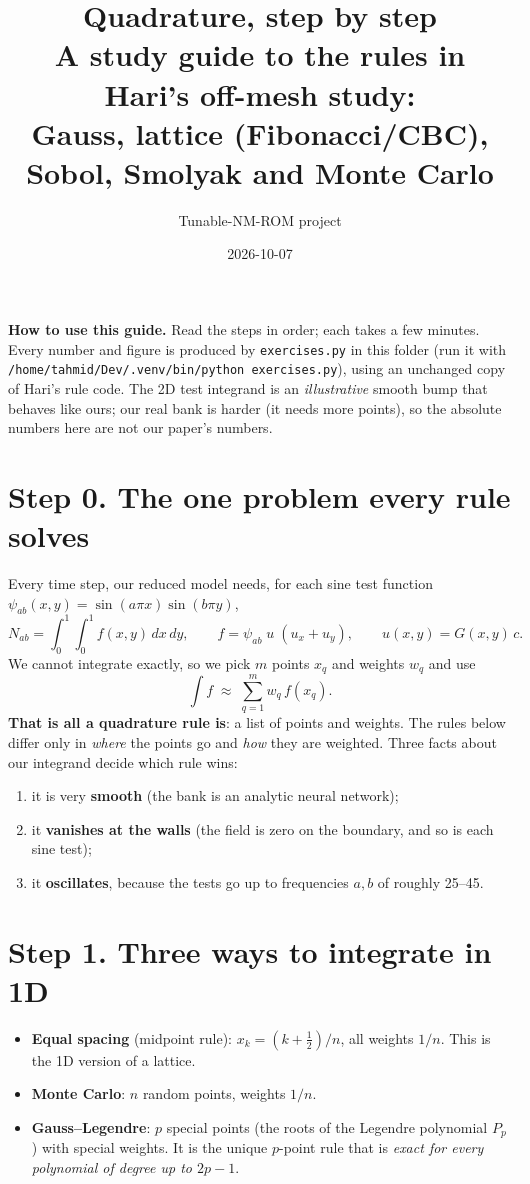 \documentclass[11pt]{article}
\title{\textbf{Quadrature, step by step}\\[3pt]\large A study guide to the rules in Hari's off-mesh study:\\Gauss, lattice (Fibonacci/CBC), Sobol, Smolyak and Monte Carlo}
\author{Tunable-NM-ROM project}
\date{2026-10-07}
\begin{document}
\maketitle

\begin{tcolorbox}[colback=gray!4,colframe=gray!50,boxrule=0.5pt,arc=2pt]
\small\textbf{How to use this guide.} Read the steps in order; each takes a few minutes. Every number and figure is
produced by \texttt{exercises.py} in this folder (run it with
\texttt{/home/tahmid/Dev/.venv/bin/python exercises.py}), using an unchanged copy of Hari's rule code.
The 2D test integrand is an \emph{illustrative} smooth bump that behaves like ours; our real bank is
harder (it needs more points), so the absolute numbers here are not our paper's numbers.
\end{tcolorbox}

\tableofcontents

\section*{Step 0. The one problem every rule solves}
Every time step, our reduced model needs, for each sine test function $\psi_{ab}(x,y)=\sin(a\pi x)\sin(b\pi y)$,
\[
N_{ab}=\int_0^1\!\!\int_0^1 f(x,y)\,dx\,dy,\qquad f=\psi_{ab}\;u\;(u_x+u_y),\qquad u(x,y)=G(x,y)\,c .
\]
We cannot integrate exactly, so we pick $m$ points $x_q$ and weights $w_q$ and use
\[
\int f\;\approx\;\sum_{q=1}^{m} w_q\,f(x_q).
\]
\textbf{That is all a quadrature rule is}: a list of points and weights. The rules below differ only in
\emph{where} the points go and \emph{how} they are weighted. Three facts about our integrand decide which rule wins:
\begin{enumerate}
\item it is very \textbf{smooth} (the bank is an analytic neural network);
\item it \textbf{vanishes at the walls} (the field is zero on the boundary, and so is each sine test);
\item it \textbf{oscillates}, because the tests go up to frequencies $a,b$ of roughly 25--45.
\end{enumerate}

\section*{Step 1. Three ways to integrate in 1D}
\begin{itemize}
\item \textbf{Equal spacing} (midpoint rule): $x_k=(k+\tfrac12)/n$, all weights $1/n$. This is the 1D version of a lattice.
\item \textbf{Monte Carlo}: $n$ random points, weights $1/n$.
\item \textbf{Gauss--Legendre}: $p$ special points (the roots of the Legendre polynomial $P_p$) with special weights.
It is the unique $p$-point rule that is \emph{exact for every polynomial of degree up to $2p-1$}.
\end{itemize}
\end{document}
